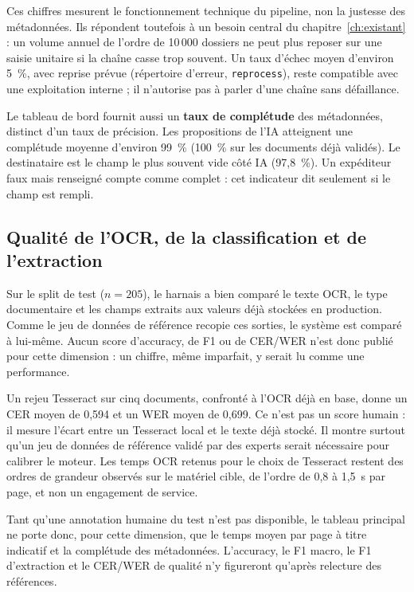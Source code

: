 Ces chiffres mesurent le fonctionnement technique du pipeline, non la justesse des métadonnées. Ils répondent toutefois à un besoin central du chapitre~\ref{ch:existant} : un volume annuel de l'ordre de 10\,000 dossiers ne peut plus reposer sur une saisie unitaire si la chaîne casse trop souvent. Un taux d'échec moyen d'environ 5~\%, avec reprise prévue (répertoire d'erreur, \texttt{reprocess}), reste compatible avec une exploitation interne ; il n'autorise pas à parler d'une chaîne sans défaillance.

Le tableau de bord fournit aussi un \textbf{taux de complétude} des métadonnées, distinct d'un taux de précision. Les propositions de l'IA atteignent une complétude moyenne d'environ 99~\% (100~\% sur les documents déjà validés). Le destinataire est le champ le plus souvent vide côté IA (97,8~\%). Un expéditeur faux mais renseigné compte comme complet : cet indicateur dit seulement si le champ est rempli.

\subsection{Qualité de l'OCR, de la classification et de l'extraction}

Sur le split de test ($n = 205$), le harnais a bien comparé le texte OCR, le type documentaire et les champs extraits aux valeurs déjà stockées en production. Comme le jeu de données de référence recopie ces sorties, le système est comparé à lui-même. Aucun score d'accuracy, de F1 ou de CER/WER n'est donc publié pour cette dimension : un chiffre, même imparfait, y serait lu comme une performance.

Un rejeu Tesseract sur cinq documents, confronté à l'OCR déjà en base, donne un CER moyen de 0,594 et un WER moyen de 0,699. Ce n'est pas un score humain : il mesure l'écart entre un Tesseract local et le texte déjà stocké. Il montre surtout qu'un jeu de données de référence validé par des experts serait nécessaire pour calibrer le moteur. Les temps OCR retenus pour le choix de Tesseract restent des ordres de grandeur observés sur le matériel cible, de l'ordre de 0,8 à 1,5~s par page, et non un engagement de service.

Tant qu'une annotation humaine du test n'est pas disponible, le tableau principal ne porte donc, pour cette dimension, que le temps moyen par page à titre indicatif et la complétude des métadonnées. L'accuracy, le F1 macro, le F1 d'extraction et le CER/WER de qualité n'y figureront qu'après relecture des références.

